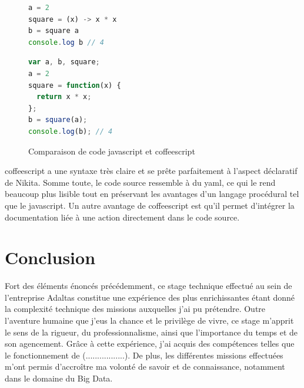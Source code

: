 \documentclass[12pt, french]{report}
\begin{document}
\begin{figure}[H]
\begin{minipage}{0.45\textwidth}
\begin{lstlisting}[language=JavaScript]
a = 2
square = (x) -> x * x
b = square a
console.log b // 4
\end{lstlisting}
\end{minipage}\hfill
\begin{minipage}{0.45\textwidth}
\begin{lstlisting}[language=JavaScript]
var a, b, square;
a = 2
square = function(x) {
  return x * x;
};
b = square(a);
console.log(b); // 4
\end{lstlisting}
\end{minipage}\hfill
\centering
\caption{Comparaison de code \gls{javascript} et \gls{coffeescript}}
\label{code:jscoffeecomparison}
\end{figure}

\gls{coffeescript} a une syntaxe très claire et se prête parfaitement à l'aspect déclaratif de Nikita. Somme toute, le code source ressemble à du \gls{yaml}, ce qui le rend beaucoup plus lisible tout en préservant les avantages d'un langage procédural tel que le \gls{javascript}. Un autre avantage de \gls{coffeescript} est qu'il permet d'intégrer la documentation liée à une action directement dans le code source.

\chapter*{Conclusion}

Fort des éléments énoncés précédemment, ce stage technique effectué au sein de l’entreprise Adaltas constitue une expérience des plus enrichissantes étant donné la complexité technique des missions auxquelles j'ai pu prétendre. Outre l’aventure humaine que j’eus la chance et le privilège de vivre, ce stage m’apprit le sens de la rigueur, du professionnalisme, ainsi que l’importance du temps et de son agencement. Grâce à cette expérience, j’ai acquis des compétences telles que le fonctionnement de (.................). De plus, les différentes missions effectuées m’ont permis d’accroître ma volonté de savoir et de connaissance, notamment dans le domaine du Big Data.

\clearpage

\printglossaries
\end{document}
